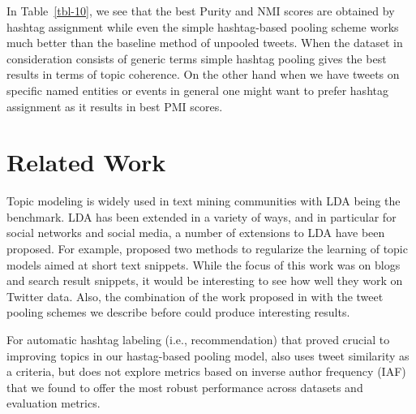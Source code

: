 \documentclass[10pt,a5paper,twoside]{article}
\begin{document}
In Table~\ref{tbl-10}, we see that the best Purity and NMI scores are
obtained by hashtag assignment while even the simple hashtag-based
pooling scheme works much better than the baseline method of unpooled
tweets. When the dataset in consideration consists of generic terms
simple hashtag pooling gives the best results in terms of topic
coherence. On the other hand when we have tweets on specific named
entities or events in general one might want to prefer hashtag
assignment as it results in best PMI scores.

\section{Related Work}

\label{sec:related_work}

Topic modeling is widely used in text mining communities with LDA
being the benchmark.  LDA has been extended in a variety of ways, and
in particular for social networks and social media, a number of
extensions to LDA have been proposed.  For example, \cite{newman11}
proposed two methods to regularize the learning of topic models aimed
at short text snippets. While the focus of this work was on blogs and
search result snippets, it would be interesting to see how well they
work on Twitter data.  Also, the combination of the work proposed in
\cite{newman11} with the tweet pooling schemes we describe before
could produce interesting results.


For automatic hashtag labeling (i.e., recommendation) that proved
crucial to improving topics in our hastag-based pooling model,
\cite{zangerle2011recommending} also uses tweet similarity as a
criteria, but does not explore metrics based on inverse author
frequency (IAF)~\cite{iaf} that we found to offer the most robust
performance across datasets and evaluation metrics.


\end{document}
